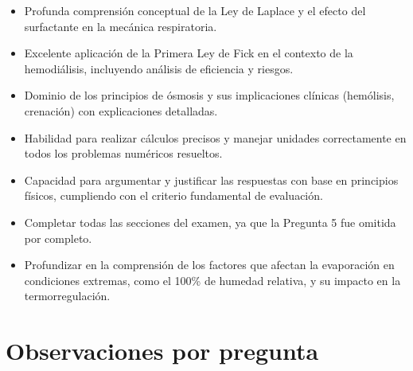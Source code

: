 \documentclass[11pt,a4paper]{article}
\begin{document}
\vspace{4pt}
\begin{minipage}[t]{0.48\linewidth}
  \begin{tcolorbox}[cajaFortaleza, title={Fortalezas}]
\begin{itemize}[leftmargin=1.5em, itemsep=2pt]
  \item Profunda comprensión conceptual de la Ley de Laplace y el efecto del surfactante en la mecánica respiratoria.
  \item Excelente aplicación de la Primera Ley de Fick en el contexto de la hemodiálisis, incluyendo análisis de eficiencia y riesgos.
  \item Dominio de los principios de ósmosis y sus implicaciones clínicas (hemólisis, crenación) con explicaciones detalladas.
  \item Habilidad para realizar cálculos precisos y manejar unidades correctamente en todos los problemas numéricos resueltos.
  \item Capacidad para argumentar y justificar las respuestas con base en principios físicos, cumpliendo con el criterio fundamental de evaluación.
\end{itemize}
  \end{tcolorbox}
\end{minipage}
\hfill
\begin{minipage}[t]{0.48\linewidth}
  \begin{tcolorbox}[cajaMejora, title={Areas de mejora}]
\begin{itemize}[leftmargin=1.5em, itemsep=2pt]
  \item Completar todas las secciones del examen, ya que la Pregunta 5 fue omitida por completo.
  \item Profundizar en la comprensión de los factores que afectan la evaporación en condiciones extremas, como el 100\% de humedad relativa, y su impacto en la termorregulación.
\end{itemize}
  \end{tcolorbox}
\end{minipage}

\section*{Observaciones por pregunta}
\end{document}
